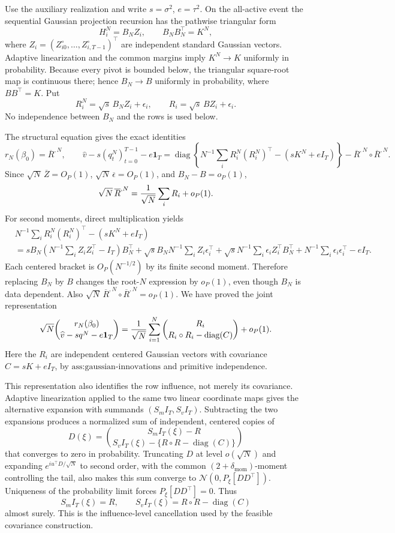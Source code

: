 Use the auxiliary realization and write \(s=\sigma^2\), \(e=\tau^2\).  On the all-active event the sequential Gaussian projection recursion has the pathwise triangular form
\[
 H_i^N=B_NZ_i,
 \qquad B_NB_N^{\top}=K^N,
\]
where \(Z_i=(Z_{i0}^{\circ},\ldots,Z_{i,T-1}^{\circ})^{\top}\) are independent standard Gaussian vectors.  Adaptive linearization and the common margins imply \(K^N\to K\) uniformly in probability.  Because every pivot is bounded below, the triangular square-root map is continuous there; hence \(B_N\to B\) uniformly in probability, where \(BB^{\top}=K\).  Put
\[
 R_i^N=\sqrt s\,B_NZ_i+\epsilon_i,
 \qquad R_i=\sqrt s\,BZ_i+\epsilon_i.
\]
No independence between \(B_N\) and the rows is used below.

The structural equation gives the exact identities
\[
 r_N(\beta_0)=\overline R^{,N},
 \qquad
 \widehat v- s(q_t^N)_{t=0}^{T-1}-e\mathbf 1_T
 =\operatorname{diag}\!\left\{N^{-1}\sum_iR_i^N(R_i^N)^{\top}-(sK^N+eI_T)\right\}
 -\overline R^{,N}\circ\overline R^{,N}.
\]
Since \(\sqrt N\,\overline Z=O_P(1)\), \(\sqrt N\,\overline\epsilon=O_P(1)\), and \(B_N-B=o_P(1)\),
\[
 \sqrt N\,\overline R^{,N}={1\over\sqrt N}\sum_iR_i+o_P(1).
\]
For second moments, direct multiplication yields
\[
 \begin{aligned}
 &N^{-1}\sum_iR_i^N(R_i^N)^{\top}-(sK^N+eI_T)\\
 &=sB_N\left(N^{-1}\sum_iZ_iZ_i^{\top}-I_T\right)B_N^{\top}
 +\sqrt s B_NN^{-1}\sum_iZ_i\epsilon_i^{\top}
 +\sqrt s N^{-1}\sum_i\epsilon_iZ_i^{\top}B_N^{\top}
 +N^{-1}\sum_i\epsilon_i\epsilon_i^{\top}-eI_T.
\end{aligned}
\]
Each centered bracket is \(O_P(N^{-1/2})\) by its finite second moment.  Therefore replacing \(B_N\) by \(B\) changes the root-\(N\) expression by \(o_P(1)\), even though \(B_N\) is data dependent.  Also \(\sqrt N\,\overline R^{,N}\circ\overline R^{,N}=o_P(1)\).  We have proved the joint representation
\[
 \sqrt N\binom{r_N(\beta_0)}{\widehat v-sq^N-e\mathbf1_T}
 ={1\over\sqrt N}\sum_{i=1}^N
 \binom{R_i}{R_i\circ R_i-\operatorname{diag}(C)}+o_P(1).
\]
Here the \(R_i\) are independent centered Gaussian vectors with covariance \(C=sK+eI_T\), by \(\text{ass:gaussian-innovations}\) and primitive independence.

This representation also identifies the row influence, not merely its covariance.  Adaptive linearization applied to the same two linear coordinate maps gives the alternative expansion with summands \((S_mI_T,S_vI_T)\).  Subtracting the two expansions produces a normalized sum of independent, centered copies of
\[
 D(\xi)=\binom{S_mI_T(\xi)-R}{S_vI_T(\xi)-\{R\circ R-\operatorname{diag}(C)\}}
\]
that converges to zero in probability.  Truncating \(D\) at level \(o(\sqrt N)\) and expanding \(e^{iu^{\top}D/\sqrt N}\) to second order, with the common \((2+\delta_{\mathrm{mom}})\)-moment controlling the tail, also makes this sum converge to \(\mathcal N(0,P_\xi[DD^{\top}])\).  Uniqueness of the probability limit forces \(P_\xi[DD^{\top}]=0\).  Thus
\[
 S_mI_T(\xi)=R,
 \qquad S_vI_T(\xi)=R\circ R-\operatorname{diag}(C)
\]
almost surely.  This is the influence-level cancellation used by the feasible covariance construction.

